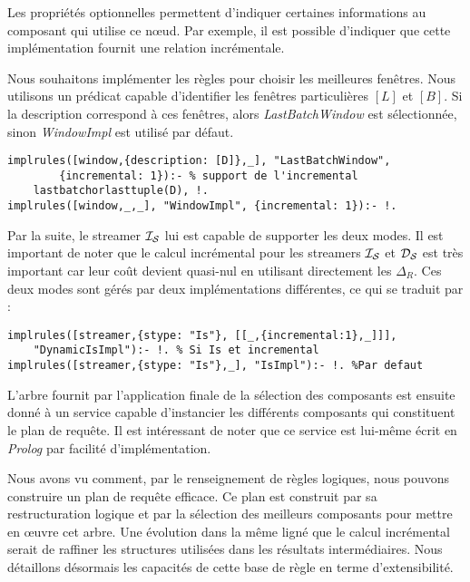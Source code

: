 Les propriétés optionnelles permettent d'indiquer certaines informations au composant qui utilise ce nœud. Par exemple, il est possible d'indiquer que cette implémentation fournit une relation incrémentale.
\begin{example}
	Nous souhaitons implémenter les règles pour choisir les meilleures fenêtres. Nous utilisons un prédicat capable d'identifier les fenêtres particulières $[L]$ et $[B]$. Si la description correspond à ces fenêtres, alors \textit{LastBatchWindow} est sélectionnée, sinon \textit{WindowImpl} est utilisé par défaut.
\begin{lstlisting}
implrules([window,{description: [D]},_], "LastBatchWindow", 
        {incremental: 1}):- % support de l'incremental
    lastbatchorlasttuple(D), !.
implrules([window,_,_], "WindowImpl", {incremental: 1}):- !.
\end{lstlisting}
\end{example}

\begin{example}
Par la suite, le streamer $\mathcal{I_S}$ lui est capable de supporter les deux modes. Il est important de noter que le calcul incrémental pour les streamers $\mathcal{I_S}$ et $\mathcal{D_S}$ est très important car leur coût devient quasi-nul en utilisant directement les $\Delta_R$. Ces deux modes sont gérés par deux implémentations différentes, ce qui se traduit par :
\begin{lstlisting}
implrules([streamer,{stype: "Is"}, [[_,{incremental:1},_]]], 
    "DynamicIsImpl"):- !. % Si Is et incremental
implrules([streamer,{stype: "Is"},_], "IsImpl"):- !. %Par defaut
\end{lstlisting}
\end{example}

L'arbre fournit par l'application finale de la sélection des composants est ensuite donné à un service capable d'instancier les différents composants qui constituent le plan de requête. Il est intéressant de noter que ce service est lui-même écrit en \textit{Prolog} par facilité d'implémentation.

Nous avons vu comment, par le renseignement de règles logiques, nous pouvons construire un plan de requête efficace. Ce plan est construit par sa restructuration logique et par la sélection des meilleurs composants pour mettre en œuvre cet arbre. Une évolution dans la même ligné que le calcul incrémental serait de raffiner les structures utilisées dans les résultats intermédiaires. Nous détaillons désormais les capacités de cette base de règle en terme d'extensibilité.
